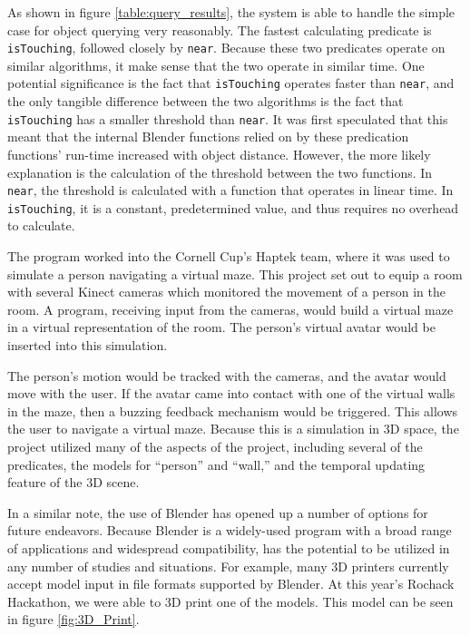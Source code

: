 As shown in figure \ref{table:query_results}, the system is able to handle the simple case for object querying very reasonably. 
The fastest calculating predicate is \texttt{isTouching}, followed closely by \texttt{near}.
Because these two predicates operate on similar algorithms, it make sense that the two operate in similar time.
One potential significance is the fact that \texttt{isTouching} operates faster than \texttt{near}, and the only tangible difference between the two algorithms is the fact that \texttt{isTouching} has a smaller threshold than \texttt{near}.
It was first speculated that this meant that the internal Blender functions relied on by these predication functions' run-time increased with object distance.
However, the more likely explanation is the calculation of the threshold between the two functions.
In \texttt{near}, the threshold is calculated with a function that operates in linear time.
In \texttt{isTouching}, it is a constant, predetermined value, and thus requires no overhead to calculate.

The program worked into the Cornell Cup's Haptek team, where it was used to simulate a person navigating a virtual maze.  
This project set out to equip a room with several Kinect cameras which monitored the movement of a person in the room. A program, receiving input from the cameras, would build a virtual maze in a virtual representation of the room. The person's virtual avatar would be inserted into this simulation. 

The person's motion would be tracked with the cameras, and the avatar would move with the user. If the avatar came into contact with one of the virtual walls in the maze, then a buzzing feedback mechanism would be triggered. This allows the user to navigate a virtual maze. Because this is a simulation in 3D space, the project utilized many of the aspects of the \TDS project, including several of the predicates, the models for ``person'' and ``wall,'' and the temporal updating feature of the 3D scene.

In a similar note, the use of Blender has opened up a number of options for future endeavors. Because Blender is a widely-used program with a broad range of applications and widespread compatibility, \TDS has the potential to be utilized in any number of studies and situations. For example, many 3D printers currently accept model input in file formats supported by Blender. At this year's Rochack Hackathon, we were able to 3D print one of the models. This model can be seen in figure \ref{fig:3D_Print}.

